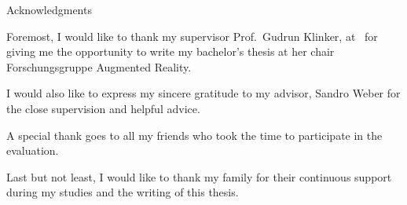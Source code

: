 \clearpage
{}
\thispagestyle{empty}

\vspace*{20mm}

\begin{center}
{ Acknowledgments}
\end{center}

\vspace{10mm}

Foremost, I would like to thank my supervisor Prof.\ Gudrun Klinker, at \getUniversity\ for giving me the opportunity to write my bachelor's thesis at her chair Forschungsgruppe Augmented Reality.

I would also like to express my sincere gratitude to my advisor, Sandro Weber for the close supervision and helpful advice.

A special thank goes to all my friends who took the time to participate in the evaluation.

Last but not least, I would like to thank my family for their continuous support during my studies and the writing of this thesis.

\cleardoublepage{}
